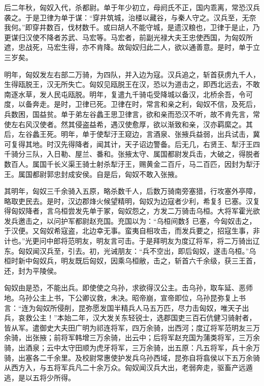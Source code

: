 \documentclass[]{article}
\begin{document}
后二年秋，匈奴入代，杀都尉。单于年少初立，母阏氏不正，国内乖离，常恐汉兵袭之。于是卫律为单于谋：``穿井筑城，治楼以藏谷，与秦人守之。汉兵至，无奈我何。''即穿井数百，伐材数千。或曰胡人不能守城，是遗汉粮也，卫律于是止，乃更谋归汉使不降者苏武、马宏等。马宏者，前副光禄大夫王忠使西国，为匈奴所遮，忠战死，马宏生得，亦不肯降。故匈奴归此二人，欲以通善意。是时，单于立三岁矣。

明年，匈奴发左右部二万骑，为四队，并入边为寇。汉兵追之，斩首获虏九千人，生得瓯脱王，汉无所失亡。匈奴见瓯脱王在汉，恐以为道击之，即西北远去，不敢南逐水草，发人民屯瓯脱。明年，复遣九千骑屯受降城以备汉，北桥余吾，令可度，以备奔走。是时，卫律已死。卫律在时，常言和亲之利，匈奴不信，及死后，兵数困，国益贫。单于弟左谷蠡王思卫律言，欲和亲而恐汉不听，故不肯先言，常使左右风汉使者。然其侵盗益希，遇汉使愈厚，欲以渐致和亲，汉亦羁縻之。其后，左谷蠡王死。明年，单于使犁汙王窥边，言酒泉、张掖兵益弱，出兵试击，冀可复得其地。时汉先得降者，闻其计，天子诏边警备。后无几，右贤王、犁汙王四千骑分三队，入日勒、屋兰、番和。张掖太守、属国都尉发兵击，大破之，得脱者数百人。属国千长义渠王骑士射杀犁汙王，赐黄金二百斤，马二百匹，因封为犁汙王。属国都尉郭忠封成安侯。自是后，匈奴不敢入张掖。

其明年，匈奴三千余骑入五原，略杀数千人，后数万骑南旁塞猎，行攻塞外亭障，略取吏民去。是时，汉边郡烽火候望精明，匈奴为边寇者少利，希复犭已塞。汉复得匈奴降者，言乌桓尝发先单于冢，匈奴怨之，方发二万骑击乌桓。大将军霍光欲发兵邀击之，以问护军都尉赵充国。充国以为：``乌桓间数犭已塞，今匈奴击之，于汉便。又匈奴希寇盗，北边幸无事。蛮夷自相攻击，而发兵要之，招寇生事，非计也。''光更问中郎将范明友，明友言可击。于是拜明友为度辽将军，将二万骑出辽东。匈奴闻汉兵至，引去。初，光诫朋友：``兵不空出，即后匈奴，遂击乌桓。''乌桓时新中匈奴兵，明友既后匈奴，因乘乌桓敝，击之，斩首六千余级，获三王首，还，封为平陵侯。

匈奴由是恐，不能出兵。即使使之乌孙，求欲得汉公主。击乌孙，取车延、恶师地。乌孙公主上书，下公卿议救，未决。昭帝崩，宣帝即位，乌孙昆弥复上书言：``连为匈奴所侵削，昆弥愿发国半精兵人马五万匹，尽力击匈奴，唯天子出兵，哀救公主！''本始二年，汉大发关东轻锐士，选郡国吏三百石伉健习骑射者，皆从军。遣御史大夫田广明为祁连将军，四万余骑，出西河；度辽将军范明友三万余骑，出张掖；前将军韩增三万余骑，出云中；后将军赵充国为蒲类将军，三万余骑，出酒泉；云中太守田顺为虎牙将军，三万余骑，出五原：凡五将军，兵十余万骑，出塞各二千余里。及校尉常惠使护发兵乌孙西域，昆弥自将翕侯以下五万余骑从西方入，与五将军兵凡二十余万众。匈奴闻汉兵大出，老弱奔走，驱畜产远遁逃，是以五将少所得。
\end{document}
